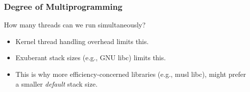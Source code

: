 \begin{frame}

\frametitle{Degree of Multiprogramming}

\vspace{\fill}

\begin{center}

How many threads can we run simultaneously?

\end{center}

\begin{itemize}

\item Kernel thread handling overhead limits this.

\item Exuberant stack sizes (e.g., GNU libc) limits this.

\item This is why more efficiency-concerned libraries (e.g., musl libc), might
prefer a smaller \emph{default} stack size.

\end{itemize}

\vspace{\fill}

\end{frame}
